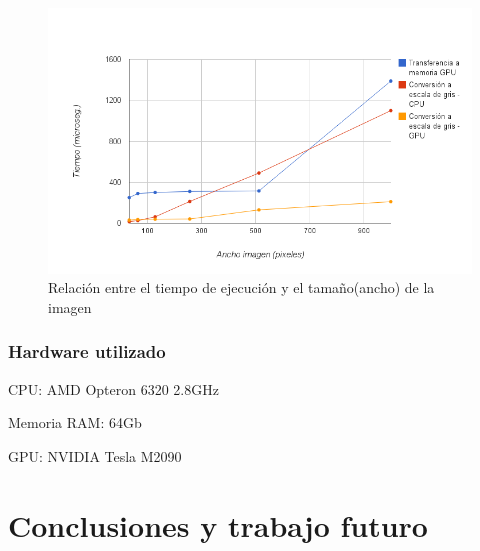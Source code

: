 \documentclass[a4paper,10pt]{report}
\begin{document}
% 


\begin{figure}
  \centering
    \includegraphics[width=1.0\textwidth]{img/sizeVstime.png}
  \caption{Relación entre el tiempo de ejecución y el tamaño(ancho) de la imagen}
  \label{sizevstime}
\end{figure}


\subsection{Hardware utilizado}


CPU: AMD Opteron 6320  2.8GHz 

Memoria RAM: 64Gb

GPU: NVIDIA Tesla M2090 








\chapter{Conclusiones y trabajo futuro}

\end{document}
